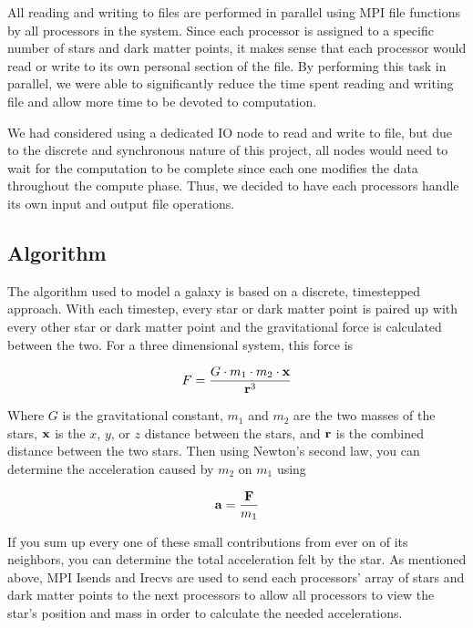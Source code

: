 \documentclass{article}
\begin{document}
All reading and writing to files are performed in parallel using MPI file functions by all processors in the system.  Since each processor is assigned to a specific number of stars and dark matter points, it makes sense that each processor would read or write to its own personal section of the file.  By performing this task in parallel, we were able to significantly reduce the time spent reading and writing file and allow more time to be devoted to computation.

We had considered using a dedicated IO node to read and write to file, but due to the discrete and synchronous nature of this project, all nodes would need to wait for the computation to be complete since each one modifies the data throughout the compute phase.  Thus, we decided to have each processors handle its own input and output file operations.

\subsection{Algorithm}

The algorithm used to model a galaxy is based on a discrete, timestepped approach.  With each timestep, every star or dark matter point is paired up with every other star or dark matter point and the gravitational force is calculated between the two.  For a three dimensional system, this force is 

\begin{equation}
F = \frac{G \cdot m_{1} \cdot m_{2} \cdot {\bf x}}{{\bf r}^{3}}
\end{equation}

Where $G$ is the gravitational constant, $m_{1}$ and $m_{2}$ are the two masses of the stars, ${\bf x}$ is the $x$, $y$, or $z$ distance between the stars, and ${\bf r}$ is the combined distance between the two stars.  Then using Newton's second law, you can determine the acceleration caused by $m_{2}$ on $m_{1}$ using

\begin{equation}
{\bf a} = \frac{{\bf F}}{m_{1}}
\end{equation}

If you sum up every one of these small contributions from ever on of its neighbors, you can determine the total acceleration felt by the star.  As mentioned above, MPI Isends and Irecvs are used to send each processors' array of stars and dark matter points to the next processors to allow all processors to view the star's position and mass in order to calculate the needed accelerations.
\end{document}
